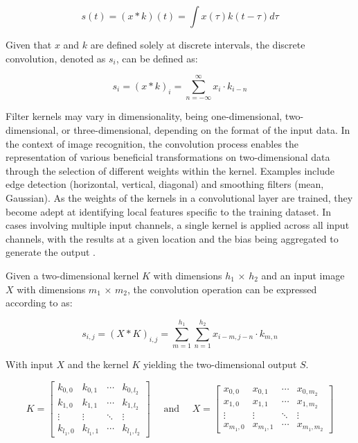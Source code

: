 \begin{equation}
    \label{eq:cnn_discrete_convolution}
    s(t) = (x * k)(t) = \int x(\tau)k(t-\tau)d\tau
\end{equation}

Given that $x$ and $k$ are defined solely at discrete intervals, the discrete convolution, denoted as $s_i$, can be defined as:

\begin{equation}
    \label{eq:cnn_discrete_convolution_si}
    s_i = (x * k)_i = \sum_{n=-\infty}^{\infty} x_i \cdot k_{i-n} 
\end{equation}

Filter kernels may vary in dimensionality, being one-dimensional, two-dimensional, or three-dimensional, depending on the format of the input data. In the context of image recognition, the convolution process enables the representation of various beneficial transformations on two-dimensional data through the selection of different weights within the kernel. Examples include edge detection (horizontal, vertical, diagonal) and smoothing filters (mean, Gaussian). As the weights of the kernels in a convolutional layer are trained, they become adept at identifying local features specific to the training dataset. In cases involving multiple input channels, a single kernel is applied across all input channels, with the results at a given location and the bias being aggregated to generate the output \cite{Bishop2023}. 

Given a two-dimensional kernel $K$ with dimensions $h_1$ × $h_2$ and an input image $X$ with dimensions $m_1$ × $m_2$, the convolution operation can be expressed according to \textcite{Rothmund2018} as:

\begin{equation}
    \label{eq:cnn_convolution_2D_1}
    s_{i, j}=(X * K)_{i, j}=\sum_{m=1}^{h_1} \sum_{n=1}^{h_2} x_{i-m, j-n} \cdot k_{m, n}
\end{equation}

With input $X$ and the kernel $K$ yielding the two-dimensional output $S$.

\begin{equation}
    \label{eq:cnn_convolution_2D_2}
    K=\left[\begin{array}{llll}
    k_{0,0} & k_{0,1} & \cdots & k_{0, l_2} \\
    k_{1,0} & k_{1,1} & \cdots & k_{1, l_2} \\
    \vdots & \vdots & \ddots & \vdots \\
    k_{l_1, 0} & k_{l_1, 1} & \cdots & k_{l_1, l_2}
    \end{array}\right] \quad \text { and } \quad X=\left[\begin{array}{llll}
    x_{0,0} & x_{0,1} & \cdots & x_{0, m_2} \\
    x_{1,0} & x_{1,1} & \cdots & x_{1, m_2} \\
    \vdots & \vdots & \ddots & \vdots \\
    x_{m_1, 0} & x_{m_1, 1} & \cdots & x_{m_1, m_2}
    \end{array}\right]
\end{equation}

